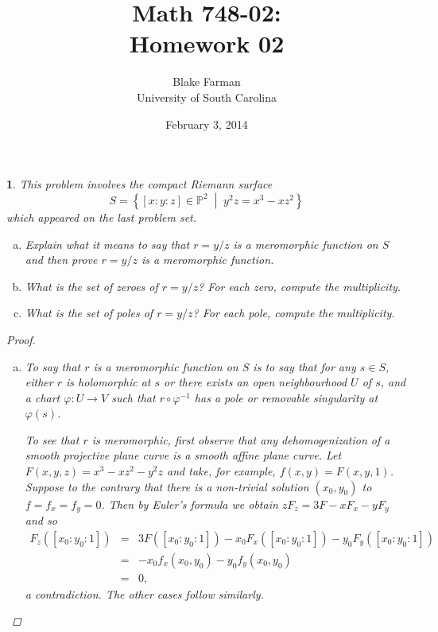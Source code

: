 \documentclass[10pt]{amsart}
\author{Blake Farman\\University of South Carolina}
\title{Math 748-02:\\Homework 02}
\date{February 3, 2014}
\begin{document}
\maketitle

\providecommand{\p}{\mathfrak{p}}
\providecommand{\m}{\mathfrak{m}}
\providecommand{\Deck}[1]{\operatorname{Deck}\left(#1\right)}

\newtheorem{thm}{}
\newtheorem{lem}{Lemma}
\newtheorem{prop}{Proposition}
\theoremstyle{definition}
\newtheorem{defn}{Definition}[thm]

\newcommand{\A}{\mathbb{A}}

\begin{thm}
  This problem involves the compact Riemann surface
  $$S = \left\{ [x : y : z] \in \mathbb{P}^2 \;\middle\vert\; y^2z = x^3 - xz^2 \right\}$$
  which appeared on the last problem set.

  \begin{enumerate}[(a)]
  \item
    Explain what it means to say that $r = y/z$ is a meromorphic function on $S$ and then prove $r = y/z$ is a meromorphic function.
  \item
    What is the set of zeroes of $r = y/z$?
    For each zero, compute the multiplicity.
  \item
    What is the set of poles of $r = y/z$?
    For each pole, compute the multiplicity.
  \end{enumerate}
  
  \begin{proof}
    \begin{enumerate}[(a)]
    \item
      To say that $r$ is a meromorphic function on $S$ is to say that for any $s \in S$, either $r$ is holomorphic at $s$ or 
      there exists an open neighbourhood $U$ of $s$, and a chart $\varphi \colon U \rightarrow V$ such that $r \circ \varphi^{-1}$ has a pole or removable singularity at $\varphi(s)$.
      
      To see that $r$ is meromorphic, first observe that any dehomogenization of a smooth projective plane curve is a smooth affine plane curve.
      Let $F(x,y,z) = x^3 - xz^2 - y^2z$ and take, for example, $f(x,y) = F(x,y,1)$.
      Suppose to the contrary that there is a non-trivial solution $(x_0, y_0)$ to $f = f_x = f_y = 0$.
      Then by Euler's formula we obtain $zF_z = 3F - xF_x - yF_y$ and so
      \begin{eqnarray*}
        F_z\left([x_0 : y_0 : 1]\right) &=& 3F\left([x_0 : y_0 : 1]\right) - x_0F_x\left([x_0 : y_0 : 1]\right) - y_0 F_y\left([x_0 : y_0 : 1]\right)\\
        &=& -x_0 f_x(x_0, y_0) - y_0 f_y(x_0, y_0)\\
        &=& 0,
      \end{eqnarray*}
      a contradiction.
      The other cases follow similarly.
      

\end{enumerate}
\end{proof}
\end{thm}
\end{document}
